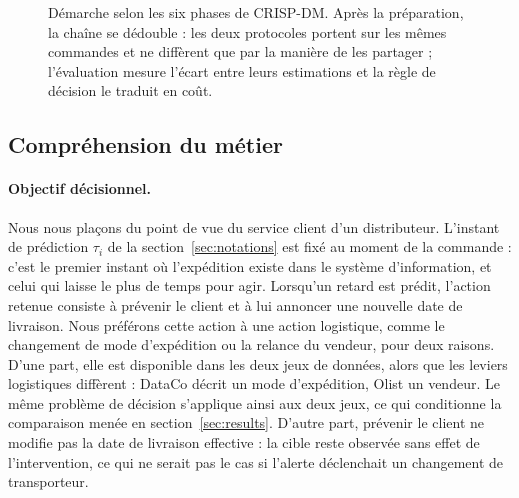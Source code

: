 \documentclass[11pt,a4paper]{article}
\theoremstyle{definition}
\begin{document}
\begin{figure}[!htbp]
\caption{Démarche selon les six phases de CRISP-DM. Après la préparation, la chaîne se dédouble : les deux protocoles portent sur les mêmes commandes et ne diffèrent que par la manière de les partager ; l'évaluation mesure l'écart entre leurs estimations et la règle de décision le traduit en coût.}
\label{fig:pipeline}
\end{figure}

\subsection{Compréhension du métier}
\label{sec:business}

\paragraph{Objectif décisionnel.} Nous nous plaçons du point de vue du service client d'un distributeur. L'instant de prédiction $\tau_i$ de la section~\ref{sec:notations} est fixé au moment de la commande : c'est le premier instant où l'expédition existe dans le système d'information, et celui qui laisse le plus de temps pour agir. Lorsqu'un retard est prédit, l'action retenue consiste à prévenir le client et à lui annoncer une nouvelle date de livraison. Nous préférons cette action à une action logistique, comme le changement de mode d'expédition ou la relance du vendeur, pour deux raisons. D'une part, elle est disponible dans les deux jeux de données, alors que les leviers logistiques diffèrent : DataCo décrit un mode d'expédition, Olist un vendeur. Le même problème de décision s'applique ainsi aux deux jeux, ce qui conditionne la comparaison menée en section~\ref{sec:results}. D'autre part, prévenir le client ne modifie pas la date de livraison effective : la cible reste observée sans effet de l'intervention, ce qui ne serait pas le cas si l'alerte déclenchait un changement de transporteur.
\end{document}
